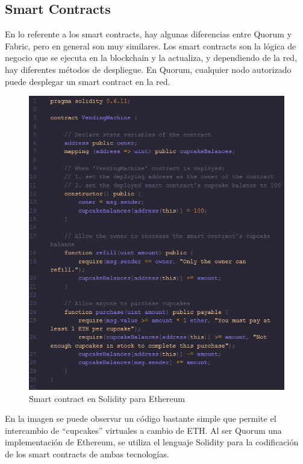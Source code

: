 \subsection*{Smart Contracts}
En lo referente a los smart contracts, hay algunas diferencias entre Quorum y Fabric, pero en general son muy similares. Los smart contracts son la lógica de negocio que se ejecuta en la blockchain y la actualiza, y dependiendo de la red, hay diferentes métodos de despliegue. En Quorum, cualquier nodo autorizado puede desplegar un smart contract en la red. \\
\begin{figure}[H]
\centerline{\includegraphics[scale=0.85]{recursos/smartcontracteth.png}}
\caption{Smart contract en Solidity para Ethereum \cite{SC-ETH}}
\label{sc-eth}
\end{figure}
En la imagen se puede observar un código bastante simple que permite el intercambio de ``cupcakes'' virtuales a cambio de ETH. Al ser Quorum una implementación de Ethereum, se utiliza el lenguaje Solidity para la codificación de los smart contracts de ambas tecnologías.\\

